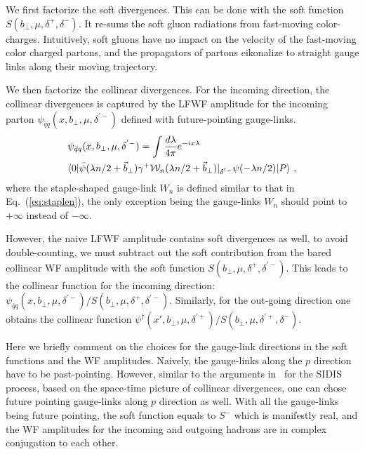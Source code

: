 \documentclass[aps,rmp,reprint,amsmath,amssymb,graphicx,longbibliography]{revtex4-1} %
\newcommand{\nn}{\nonumber}
\begin{document}
We first factorize the soft divergences. This can be done with the soft function $S(b_\perp,\mu,\delta^+,\delta^-)$. It re-sums the soft gluon radiations from fast-moving color-charges. Intuitively, soft gluons have no impact on the velocity of the fast-moving color charged partons, and the propagators of partons eikonalize to straight gauge links along their moving trajectory.

We then factorize the collinear divergences. For the incoming direction, the collinear divergences is captured by the LFWF amplitude for the incoming parton $\psi_{\bar q q}(x,b_\perp,\mu,\delta^{'-})$ defined with future-pointing gauge-links.
\begin{align}
	&\psi_{\bar q q}(x,b_\perp,\mu,\delta^{'-})=\int\frac{d\lambda}{4\pi}e^{-ix\lambda}\\
	&\langle 0|\bar \psi(\lambda n/2 +\vec{b}_\perp)\gamma^+{\cal W}_n(\lambda n/2+\vec{b}_\perp)|_{\delta^{'-}}\psi(-\lambda n/2)|P\rangle \ ,\nn
\end{align}
where the staple-shaped gauge-link $W_n$ is defined similar to that in Eq.~(\ref{eq:staplen}), the only exception being the gauge-links $W_n$ should point to $+\infty$ instead of  $-\infty$.

However, the naive LFWF amplitude contains soft divergences as well, to avoid double-counting, we must subtract out the soft contribution from the bared collinear WF amplitude with the soft function $S(b_\perp,\mu,\delta^+,\delta^{'-})$. This leads to the collinear function for the incoming direction: $\psi_{\bar q q}(x,b_\perp,\mu,\delta^{'-})/S(b_\perp,\mu,\delta^+,\delta^{'-})$. Similarly, for the out-going direction one obtains the collinear function $\psi^{\dagger}(x',b_\perp,\mu,\delta^{'+})/S(b_\perp,\mu,\delta^{'+},\delta^{-})$.

Here we briefly comment on the choices for the gauge-link directions in the soft functions and the WF amplitudes. Naively, the gauge-links along the $p$ direction have to be past-pointing. However, similar to the arguments in~\cite{Collins:2004nx} for the SIDIS process, based on the space-time picture of collinear divergences, one can chose future pointing gauge-links along $p$ direction as well. With all the gauge-links being future pointing, the soft function equals to $S^-$ which is manifestly real, and the WF amplitudes for the incoming and outgoing hadrons are in complex conjugation to each other.
\end{document}
